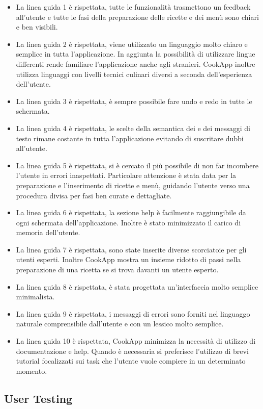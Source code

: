 \begin{itemize}
\item
La linea guida 1 è rispettata, tutte le funzionalità trasmettono un
feedback all'utente e tutte le fasi della preparazione delle ricette e
dei menù sono chiari e ben visibili.
\item
La linea guida 2 è rispettata, viene utilizzato un linguaggio molto
chiaro e semplice in tutta l'applicazione. In aggiunta la possibilità di
utilizzare lingue differenti rende familiare l'applicazione anche agli
stranieri. CookApp inoltre utilizza linguaggi con livelli tecnici
culinari diversi a seconda dell'esperienza dell'utente.
\item
La linea guida 3 è rispettata, è sempre possibile fare undo e redo in
tutte le schermata. 
\item 
La linea guida 4 è rispettata, le scelte della semantica dei e dei
messaggi di testo rimane costante in tutta l'applicazione evitando di
suscritare dubbi all'utente.
\item
La linea guida 5 è rispettata, si è cercato il più possibile di non far
incombere l'utente in errori inaspettati. Particolare attenzione è stata
data per la preparazione e l'inserimento di ricette e menù, guidando
l'utente verso una procedura divisa per fasi ben curate e dettagliate. 
\item 
La linea guida 6 è rispettata, la sezione help è facilmente
raggiungibile da ogni schermata dell'applicazione. Inoltre è stato
minimizzato il carico di memoria dell'utente.
\item
La linea guida 7 è rispettata, sono state inserite diverse scorciatoie
per gli utenti esperti. Inoltre CookApp mostra un insieme ridotto di
passi nella preparazione di una ricetta se si trova davanti un utente
esperto.
\item
La linea guida 8 è rispettata, è stata progettata un'interfaccia molto
semplice minimalista.
\item
La linea guida 9 è rispettata, i messaggi di errori sono forniti nel
linguaggo naturale comprensibile dall'utente e con un lessico molto
semplice.
\item
La linea guida 10 è rispettata, CookApp minimizza la necessità di
utilizzo di documentazione e help. Quando è necessaria si preferisce
l'utilizzo di brevi tutorial focalizzati sui task che l'utente vuole
compiere in un determinato momento.
\end{itemize}

\subsection{User Testing}

